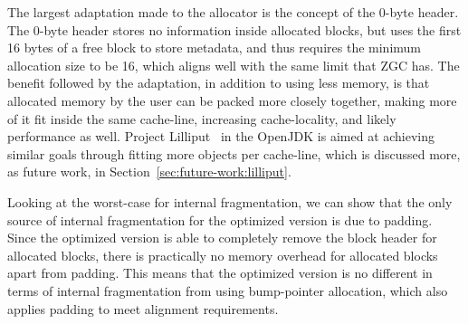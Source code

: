 
The largest adaptation made to the allocator is the concept of the 0-byte header. The 0-byte header stores no information inside allocated blocks, but uses the first 16 bytes of a free block to store metadata, and thus requires the minimum allocation size to be 16, which aligns well with the same limit that ZGC has. The benefit followed by the adaptation, in addition to using less memory, is that allocated memory by the user can be packed more closely together, making more of it fit inside the same cache-line, increasing cache-locality, and likely performance as well. Project Lilliput~\cite{lilliput} in the OpenJDK is aimed at achieving similar goals through fitting more objects per cache-line, which is discussed more, as future work, in Section~\ref{sec:future-work:lilliput}.

Looking at the worst-case for internal fragmentation, we can show that the only source of internal fragmentation for the optimized version is due to padding. Since the optimized version is able to completely remove the block header for allocated blocks, there is practically no memory overhead for allocated blocks apart from padding. This means that the optimized version is no different in terms of internal fragmentation from using bump-pointer allocation, which also applies padding to meet alignment requirements.


